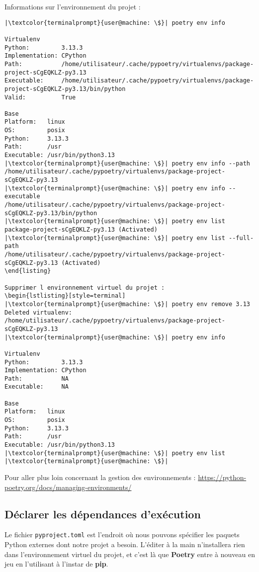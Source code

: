 Informations sur l'environnement du projet :
\begin{lstlisting}[style=terminal]
|\textcolor{terminalprompt}{user@machine: \$}| poetry env info

Virtualenv
Python:         3.13.3
Implementation: CPython
Path:           /home/utilisateur/.cache/pypoetry/virtualenvs/package-project-sCgEQKLZ-py3.13
Executable:     /home/utilisateur/.cache/pypoetry/virtualenvs/package-project-sCgEQKLZ-py3.13/bin/python
Valid:          True

Base
Platform:   linux
OS:         posix
Python:     3.13.3
Path:       /usr
Executable: /usr/bin/python3.13
|\textcolor{terminalprompt}{user@machine: \$}| poetry env info --path
/home/utilisateur/.cache/pypoetry/virtualenvs/package-project-sCgEQKLZ-py3.13
|\textcolor{terminalprompt}{user@machine: \$}| poetry env info --executable
/home/utilisateur/.cache/pypoetry/virtualenvs/package-project-sCgEQKLZ-py3.13/bin/python
|\textcolor{terminalprompt}{user@machine: \$}| poetry env list
package-project-sCgEQKLZ-py3.13 (Activated)
|\textcolor{terminalprompt}{user@machine: \$}| poetry env list --full-path
/home/utilisateur/.cache/pypoetry/virtualenvs/package-project-sCgEQKLZ-py3.13 (Activated)
\end{listing}

Supprimer l environnement virtuel du projet :
\begin{lstlisting}[style=terminal]
|\textcolor{terminalprompt}{user@machine: \$}| poetry env remove 3.13
Deleted virtualenv: /home/utilisateur/.cache/pypoetry/virtualenvs/package-project-sCgEQKLZ-py3.13
|\textcolor{terminalprompt}{user@machine: \$}| poetry env info

Virtualenv
Python:         3.13.3
Implementation: CPython
Path:           NA
Executable:     NA

Base
Platform:   linux
OS:         posix
Python:     3.13.3
Path:       /usr
Executable: /usr/bin/python3.13
|\textcolor{terminalprompt}{user@machine: \$}| poetry env list
|\textcolor{terminalprompt}{user@machine: \$}| 
\end{lstlisting}

Pour aller plus loin concernant la gestion des environnements : \url{https://python-poetry.org/docs/managing-environments/}

\subsection*{Déclarer les dépendances d'exécution}
Le fichier \texttt{pyproject.toml} est l'endroit où nous pouvons spécifier les paquets Python externes dont notre projet a besoin. L'éditer à la main n'installera rien dans l'environnement virtuel du projet, et c'est là que \textbf{Poetry} entre à nouveau en jeu en l'utilisant à l'instar de \textbf{pip}.

